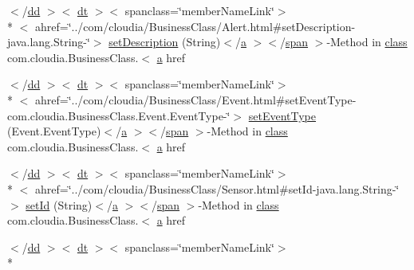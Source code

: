 \begin{DoxyCompactItemize}
\item 
$<$/\hyperlink{stylesheet_8css_a47f4718a86835a7771ec592ece845221}{dd} $>$$<$ \hyperlink{stylesheet_8css_a107565fb4039d33b041380d6e0ea1d80}{dt} $>$$<$ spanclass=\char`\"{}member\-Name\-Link\char`\"{}$>$\\*
$<$ ahref=\char`\"{}../com/cloudia/Business\-Class/Alert.\-html\#set\-Description-\/java.\-lang.\-String-\/\char`\"{}$>$ \hyperlink{index-17_8html_a9956f6656ffda70b0beb39614f2c5d89}{set\-Description} (String)$<$/\hyperlink{style_8css_a5e8981582017bb8b84c21f148345d1f7}{a} $>$$<$/\hyperlink{stylesheet_8css_a8343996ebcf16220b04e54659aac31cc}{span} $>$-\/Method in \hyperlink{_tools_8html_acf06f836132665ba8114f5a414c2403f}{class} com.\-cloudia.\-Business\-Class.$<$ \hyperlink{style_8css_a5e8981582017bb8b84c21f148345d1f7}{a} href
\item 
$<$/\hyperlink{stylesheet_8css_a47f4718a86835a7771ec592ece845221}{dd} $>$$<$ \hyperlink{stylesheet_8css_a107565fb4039d33b041380d6e0ea1d80}{dt} $>$$<$ spanclass=\char`\"{}member\-Name\-Link\char`\"{}$>$\\*
$<$ ahref=\char`\"{}../com/cloudia/Business\-Class/Event.\-html\#set\-Event\-Type-\/com.\-cloudia.\-Business\-Class.\-Event.\-Event\-Type-\/\char`\"{}$>$ \hyperlink{index-17_8html_ac44c73c62c73e25b85ae452c16766073}{set\-Event\-Type} (Event.\-Event\-Type)$<$/\hyperlink{style_8css_a5e8981582017bb8b84c21f148345d1f7}{a} $>$$<$/\hyperlink{stylesheet_8css_a8343996ebcf16220b04e54659aac31cc}{span} $>$-\/Method in \hyperlink{_tools_8html_acf06f836132665ba8114f5a414c2403f}{class} com.\-cloudia.\-Business\-Class.$<$ \hyperlink{style_8css_a5e8981582017bb8b84c21f148345d1f7}{a} href
\item 
$<$/\hyperlink{stylesheet_8css_a47f4718a86835a7771ec592ece845221}{dd} $>$$<$ \hyperlink{stylesheet_8css_a107565fb4039d33b041380d6e0ea1d80}{dt} $>$$<$ spanclass=\char`\"{}member\-Name\-Link\char`\"{}$>$\\*
$<$ ahref=\char`\"{}../com/cloudia/Business\-Class/Sensor.\-html\#set\-Id-\/java.\-lang.\-String-\/\char`\"{}$>$ \hyperlink{index-17_8html_a0de6155ed6d301154d89de417ba1b28f}{set\-Id} (String)$<$/\hyperlink{style_8css_a5e8981582017bb8b84c21f148345d1f7}{a} $>$$<$/\hyperlink{stylesheet_8css_a8343996ebcf16220b04e54659aac31cc}{span} $>$-\/Method in \hyperlink{_tools_8html_acf06f836132665ba8114f5a414c2403f}{class} com.\-cloudia.\-Business\-Class.$<$ \hyperlink{style_8css_a5e8981582017bb8b84c21f148345d1f7}{a} href
\item 
$<$/\hyperlink{stylesheet_8css_a47f4718a86835a7771ec592ece845221}{dd} $>$$<$ \hyperlink{stylesheet_8css_a107565fb4039d33b041380d6e0ea1d80}{dt} $>$$<$ spanclass=\char`\"{}member\-Name\-Link\char`\"{}$>$\\*
$$
\end{DoxyCompactItemize}
